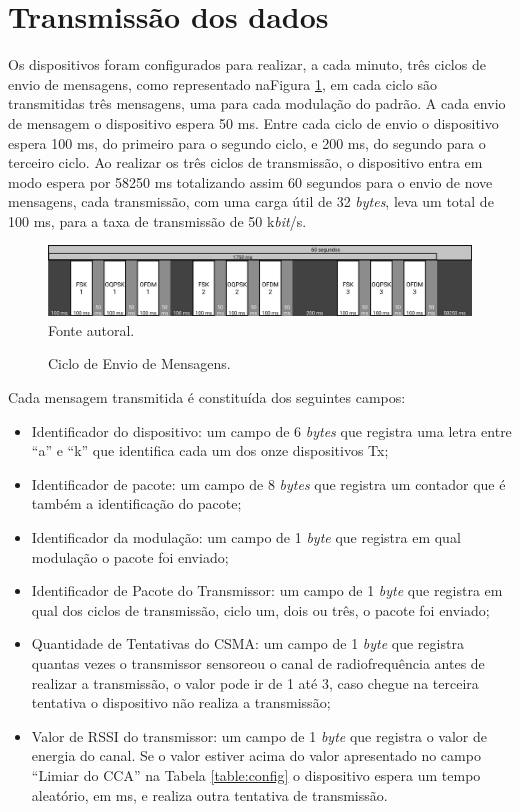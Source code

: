 \section{Transmissão dos dados}
Os dispositivos foram configurados para realizar, a cada minuto, três ciclos de envio de mensagens, como representado naFigura \ref{fig:ciclo_envio}, em cada ciclo são transmitidas três mensagens, uma para cada modulação do padrão. A cada envio de mensagem o dispositivo espera 50 ms. Entre cada ciclo de envio o dispositivo espera 100 ms, do primeiro para o segundo ciclo, e 200 ms, do segundo para o terceiro ciclo. Ao realizar os três ciclos de transmissão, o dispositivo entra em modo espera por 58250 ms totalizando assim 60 segundos para o envio de nove mensagens, cada transmissão, com uma carga útil de 32 \emph{bytes}, leva um total de 100 ms, para a taxa de transmissão de 50 k\emph{bit}/s.

\begin{figure}[h]
      \centering
      \caption{Ciclo de Envio de Mensagens.}
      \includegraphics[width=\textwidth]{./sections/textual/chapters/images/metodo_ciclo_envio.png}\\
      Fonte autoral.
      \label{fig:ciclo_envio}
\end{figure}

Cada mensagem transmitida é constituída dos seguintes campos:
\begin{itemize}
      \label{table:estruturaTx}
      \item Identificador do dispositivo: um campo de 6 \emph{bytes} que registra uma letra entre ``a'' e ``k'' que identifica cada um dos onze dispositivos Tx;
      \item Identificador de pacote: um campo de 8 \emph{bytes} que registra um contador que é também a identificação do pacote;
      \item Identificador da modulação: um campo de 1 \emph{byte} que registra em qual modulação o pacote foi enviado;
      \item Identificador de Pacote do Transmissor: um campo de 1 \emph{byte} que registra em qual dos ciclos de transmissão, ciclo um, dois ou três, o pacote foi enviado;
      \item Quantidade de Tentativas do CSMA: um campo de 1 \emph{byte} que registra quantas vezes o transmissor sensoreou o canal de radiofrequência antes de realizar a transmissão, o valor pode ir de 1 até 3, caso chegue na terceira tentativa o dispositivo não realiza a transmissão;
      \item Valor de RSSI do transmissor: um campo de 1 \emph{byte} que registra o valor de energia do canal. Se o valor estiver acima do valor apresentado no campo ``Limiar do CCA'' na Tabela \ref{table:config} o dispositivo espera um tempo aleatório, em ms, e realiza outra tentativa de transmissão.
\end{itemize}


